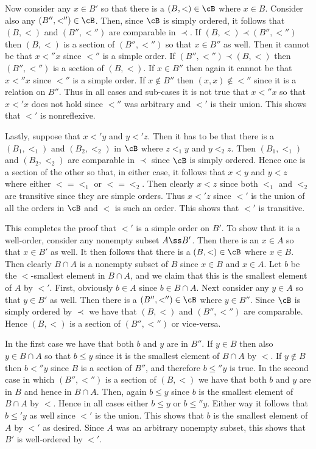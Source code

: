 {{    Now consider any $x \in B'$ so that there is a $(B,<) \in \cB$ where $x \in B$.
    Consider also any $(B'', <'') \in \cB$.
    Then, since $\cB$ is simply ordered, it follows that $(B,<)$ and $(B'', <'')$ are comparable in $\prec$.
    If $(B,<) \prec (B'',<'')$ then $(B,<)$ is a section of $(B'',<'')$ so that $x \in B''$ as well.
    Then it cannot be that $x <'' x$ since $<''$ is a simple order.
    If $(B'',<'') \prec (B,<)$ then $(B'',<'')$ is a section of $(B,<)$.
    If $x \in B''$ then again it cannot be that $x <'' x$ since $<''$ is a simple order.
    If $x \notin B''$ then $(x, x) \notin <''$ since it is a relation on $B''$.
    Thus in all cases and sub-cases it is not true that $x <'' x$ so that $x <' x$ does not hold since $<''$ was arbitrary and $<'$ is their union.
    This shows that $<'$ is nonreflexive.

    Lastly, suppose that $x <' y$ and $y <' z$.
    Then it has to be that there is a $(B_1, <_1)$ and $(B_2, <_2)$ in $\cB$ where $z <_1 y$ and  $y <_2 z$.
    Then $(B_1, <_1)$ and $(B_2, <_2)$ are comparable in $\prec$ since $\cB$ is simply ordered.
    Hence one is a section of the other so that, in either case, it follows that $x < y$ and $y < z$ where either $< = <_1$ or $< = <_2$.
    Then clearly $x < z$ since both $<_1$ and $<_2$ are transitive since they are simple orders.
    Thus $x <' z$ since $<'$ is the union of all the orders in $\cB$ and $<$ is such an order.
    This shows that $<'$ is transitive.

    This completes the proof that $<'$ is a simple order on $B'$.
    To show that it is a well-order, consider any nonempty subset $A \ss B'$.
    Then there is an $x \in A$ so that $x \in B'$ as well.
    It then follows that there is a $(B, <) \in \cB$ where $x \in B$.
    Then clearly $B \cap A$ is a nonempty subset of $B$ since $x \in B$ and $x \in A$.
    Let $b$ be the $<$-smallest element in $B \cap A$, and we claim that this is the smallest element of $A$ by $<'$.
    First, obviously $b \in A$ since $b \in B \cap A$.
    Next consider any $y \in A$ so that $y \in B'$ as well.
    Then there is a $(B'', <'') \in \cB$ where $y \in B''$.
    Since $\cB$ is simply ordered by $\prec$ we have that $(B,<)$ and $(B'',<'')$ are comparable.
    Hence $(B,<)$ is a section of $(B'',<'')$ or vice-versa.
    
    In the first case we have that both $b$ and $y$ are in $B''$.
    If $y \in B$ then also $y \in B \cap A$ so that $b \leq y$ since it is the smallest element of $B \cap A$ by $<$.
    If $y \notin B$ then $b <'' y$ since $B$ is a section of $B''$, and therefore $b \leq'' y$ is true.
    In the second case in which $(B'',<'')$ is a section of $(B,<)$ we have that both $b$ and $y$ are in $B$ and hence in $B \cap A$.
    Then, again $b \leq y$ since $b$ is the smallest element of $B \cap A$ by $<$.
    Hence in all cases either $b \leq y$ or $b \leq'' y$.
    Either way it follows that $b \leq' y$ as well since $<'$ is the union.
    This shows that $b$ is the smallest element of $A$ by $<'$ as desired.
    Since $A$ was an arbitrary nonempty subset, this shows that $B'$ is well-ordered by $<'$.
  }
}

